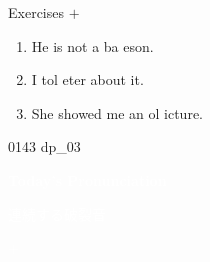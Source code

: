 \documentclass[aspectratio=169,xcolor={dvipsnames,table}]{beamer}
\begin{document}
\begin{frame}[plain]{Exercises  $+$ }
  \Large
  \begin{enumerate}
    \item<2-> He is not a ba  \hspace{-2pt}eson.
    \item<4-> I tol  eter about it.
    \item<6-> She showed me an ol  icture.
  \end{enumerate}

  \hfill{\tiny 0143}\,{\scriptsize {}\,dp\_03}

\end{frame}
\begin{frame}
  \hypertarget{today}{}
  \centering
  \textcolor{white}{\Huge\bfseries Today's Pronunciation}

  \vspace{30pt}

  \textcolor{white}{\Large 連続する破裂音}

  \textcolor{white}{\Large {} $+$ }
\end{frame}
\end{document}
